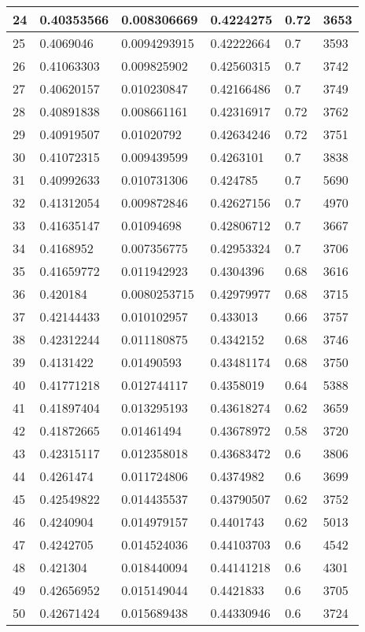 \begin{longtable}{|l|l|l|l|l|l|}
24 & 0.40353566 & 0.008306669 & 0.4224275 & 0.72 & 3653 \\ \hline 
25 & 0.4069046 & 0.0094293915 & 0.42222664 & 0.7 & 3593 \\ \hline 
26 & 0.41063303 & 0.009825902 & 0.42560315 & 0.7 & 3742 \\ \hline 
27 & 0.40620157 & 0.010230847 & 0.42166486 & 0.7 & 3749 \\ \hline 
28 & 0.40891838 & 0.008661161 & 0.42316917 & 0.72 & 3762 \\ \hline 
29 & 0.40919507 & 0.01020792 & 0.42634246 & 0.72 & 3751 \\ \hline 
30 & 0.41072315 & 0.009439599 & 0.4263101 & 0.7 & 3838 \\ \hline 
31 & 0.40992633 & 0.010731306 & 0.424785 & 0.7 & 5690 \\ \hline 
32 & 0.41312054 & 0.009872846 & 0.42627156 & 0.7 & 4970 \\ \hline 
33 & 0.41635147 & 0.01094698 & 0.42806712 & 0.7 & 3667 \\ \hline 
34 & 0.4168952 & 0.007356775 & 0.42953324 & 0.7 & 3706 \\ \hline 
35 & 0.41659772 & 0.011942923 & 0.4304396 & 0.68 & 3616 \\ \hline 
36 & 0.420184 & 0.0080253715 & 0.42979977 & 0.68 & 3715 \\ \hline 
37 & 0.42144433 & 0.010102957 & 0.433013 & 0.66 & 3757 \\ \hline 
38 & 0.42312244 & 0.011180875 & 0.4342152 & 0.68 & 3746 \\ \hline 
39 & 0.4131422 & 0.01490593 & 0.43481174 & 0.68 & 3750 \\ \hline 
40 & 0.41771218 & 0.012744117 & 0.4358019 & 0.64 & 5388 \\ \hline 
41 & 0.41897404 & 0.013295193 & 0.43618274 & 0.62 & 3659 \\ \hline 
42 & 0.41872665 & 0.01461494 & 0.43678972 & 0.58 & 3720 \\ \hline 
43 & 0.42315117 & 0.012358018 & 0.43683472 & 0.6 & 3806 \\ \hline 
44 & 0.4261474 & 0.011724806 & 0.4374982 & 0.6 & 3699 \\ \hline 
45 & 0.42549822 & 0.014435537 & 0.43790507 & 0.62 & 3752 \\ \hline 
46 & 0.4240904 & 0.014979157 & 0.4401743 & 0.62 & 5013 \\ \hline 
47 & 0.4242705 & 0.014524036 & 0.44103703 & 0.6 & 4542 \\ \hline 
48 & 0.421304 & 0.018440094 & 0.44141218 & 0.6 & 4301 \\ \hline 
49 & 0.42656952 & 0.015149044 & 0.4421833 & 0.6 & 3705 \\ \hline 
50 & 0.42671424 & 0.015689438 & 0.44330946 & 0.6 & 3724 \\ \hline 
\end{longtable}